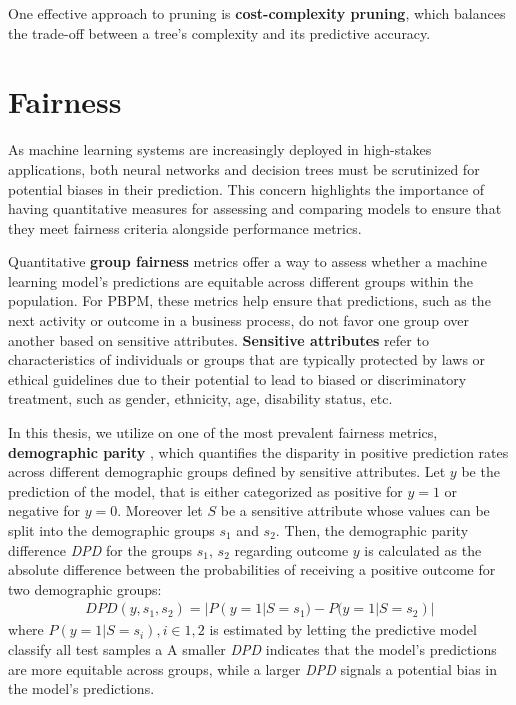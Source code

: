 One effective approach to pruning is \textbf{cost-complexity pruning},
which balances the trade-off between a tree's complexity and its predictive accuracy.
\cite{ccp}

\section{Fairness}
As machine learning systems are increasingly deployed in high-stakes applications,
both neural networks and decision trees must be scrutinized for potential biases in their prediction.
This concern highlights the importance of having quantitative measures
for assessing and comparing models to ensure that they meet fairness criteria
alongside performance metrics.

Quantitative \textbf{group fairness} metrics offer a way to assess whether a machine learning model's predictions
are equitable across different groups within the population.
For PBPM, these metrics help ensure that predictions, such as the next activity or outcome in a business process,
do not favor one group over another based on sensitive attributes.
\textbf{Sensitive attributes} refer to characteristics of individuals or groups
that are typically protected by laws or ethical guidelines due to their potential to lead to biased or discriminatory treatment,
such as gender, ethnicity, age, disability status, etc.

In this thesis, we utilize on one of the most prevalent fairness metrics, \textbf{demographic parity} \cite{dem_parity},
which quantifies the disparity in positive prediction rates across different demographic groups defined by sensitive attributes. 
Let $y$ be the prediction of the model, that is either categorized as positive for $y = 1$ or negative for $y = 0$.
Moreover let $S$ be a sensitive attribute whose values can be split into the demographic groups $s_1$ and $s_2$.
Then, the demographic parity difference \textit{DPD} for the groups $s_1$, $s_2$ regarding outcome $y$
is calculated as the absolute difference between the probabilities of receiving a positive outcome for two demographic groups:
\begin{align}
  \textit{DPD}(y, s_1, s_2) = |P(y = 1 |S = s_1) - P(y = 1 |S = s_2)|
\end{align}
where $P(y = 1 |S = s_i), i \in {1,2}$ is estimated by letting the predictive model classify
all test samples a
A smaller \textit{DPD} indicates that the model's predictions are more equitable across groups,
while a larger \textit{DPD} signals a potential bias in the model's predictions.

